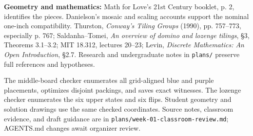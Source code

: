 \documentclass[11pt]{article}
\begin{document}
\textbf{Geometry and mathematics:} Math for Love's 21st Century booklet, p. 2, identifies the pieces. Danielson's mosaic and scaling accounts support the nominal one-inch compatibility. Thurston, \emph{Conway's Tiling Groups} (1990), pp. 757--773, especially p. 767; Saldanha--Tomei, \emph{An overview of domino and lozenge tilings}, \S3, Theorems 3.1--3.2; MIT 18.312, lectures 20--23; Levin, \emph{Discrete Mathematics: An Open Introduction}, \S2.7. Research and undergraduate notes in \texttt{plans/} preserve full references and hypotheses.

The middle-board checker enumerates all grid-aligned blue and purple placements, optimizes disjoint packings, and saves exact witnesses. The lozenge checker enumerates the six upper states and six flips. Student geometry and solution drawings use the same checked coordinates. Source notes, classroom evidence, and draft guidance are in \texttt{plans/week-01-classroom-review.md}; AGENTS.md changes await organizer review.
\end{document}
